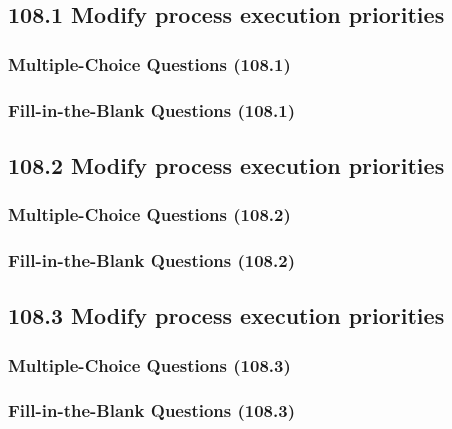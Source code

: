 \documentclass[a4paper]{report}
\begin{document}
\subsection*{108.1 Modify process execution priorities}
\subsubsection*{Multiple-Choice Questions (108.1)}

\subsubsection*{Fill-in-the-Blank Questions (108.1)}

\subsection*{108.2 Modify process execution priorities}
\subsubsection*{Multiple-Choice Questions (108.2)}

\subsubsection*{Fill-in-the-Blank Questions (108.2)}

\subsection*{108.3 Modify process execution priorities}
\subsubsection*{Multiple-Choice Questions (108.3)}

\subsubsection*{Fill-in-the-Blank Questions (108.3)}

\end{document}
